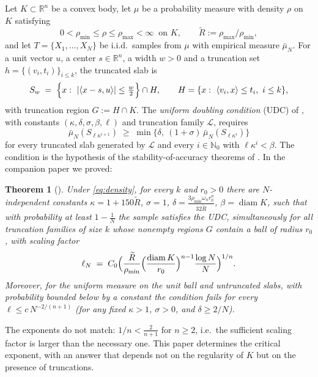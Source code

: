 ﻿\documentclass[11pt]{article}
\newtheorem{theorem}{Theorem}[section]
\newcommand{\R}{\mathbb{R}}
\newcommand{\emp}{\bar\mu_N}
\newcommand{\diam}{\operatorname{diam}}
\begin{document}
Let $K\subset\R^n$ be a convex body, let $\mu$ be a probability measure with
density $\rho$ on $K$ satisfying
\begin{equation}\label{eq:density}
0<\rho_{\min}\le\rho\le\rho_{\max}<\infty\ \text{ on }K,
\qquad\widetilde R:=\rho_{\max}/\rho_{\min},
\end{equation}
and let $T=\{X_1,\dots,X_N\}$ be i.i.d.\ samples from $\mu$ with empirical
measure $\emp$.  For a unit vector $u$, a center $s\in\R^n$, a width $w>0$ and a
truncation set $h=\{(v_i,t_i)\}_{i\le k}$, the truncated slab is
\[
S_w\;=\;\Bigl\{x:\ |\langle x-s,u\rangle|\le\tfrac w2\Bigr\}\cap H,
\qquad
H=\{x:\ \langle v_i,x\rangle\le t_i,\ i\le k\},
\]
with truncation region $G:=H\cap K$.  The \emph{uniform doubling condition}
(UDC) of \cite{ShmaloUDC}, with constants $(\kappa,\delta,\sigma,\beta,\ell)$ and
truncation family $\mathcal L$, requires
\[
\emp(S_{\ell\kappa^{i+1}})\;\ge\;
\min\bigl\{\delta,\ (1+\sigma)\,\emp(S_{\ell\kappa^{i}})\bigr\}
\]
for every truncated slab generated by $\mathcal L$ and every
$i\in\mathbb N_0$ with $\ell\kappa^i<\beta$.  The condition is the hypothesis of
the stability-of-accuracy theorems of \cite{BJS,ShmaloUDC}.  In the companion
paper \cite{companion2} we proved:

\begin{theorem}[{\cite{companion2}}]\label{thm:old}
Under \eqref{eq:density}, for every $k$ and $r_0>0$ there are
$N$-independent constants $\kappa=1+150\widetilde R$, $\sigma=1$,
$\delta=\frac{3\rho_{\min}\omega_nr_0^n}{32\widetilde R}$, $\beta=\diam K$, such
that with probability at least $1-\frac1N$ the sample satisfies the UDC,
simultaneously for all truncation families of size $k$ whose nonempty regions
$G$ contain a ball of radius $r_0$, with scaling factor
\[
\ell_N\;=\;C_0\Bigl(\frac{\widetilde R}{\rho_{\min}}
\Bigl(\frac{\diam K}{r_0}\Bigr)^{n-1}\frac{\log N}{N}\Bigr)^{1/n}.
\]
Moreover, for the uniform measure on the unit ball and untruncated slabs, with
probability bounded below by a constant the condition fails for every
$\ell\le c\,N^{-2/(n+1)}$ {\rm(}for any fixed $\kappa>1$, $\sigma>0$, and
$\delta\ge2/N${\rm)}.
\end{theorem}

The exponents do not match: $1/n<\frac{2}{n+1}$ for $n\ge2$, i.e.\ the
sufficient scaling factor is larger than the necessary one.  This paper
determines the critical exponent, with an answer that depends not on the
regularity of $K$ but on the presence of truncations.
\end{document}
